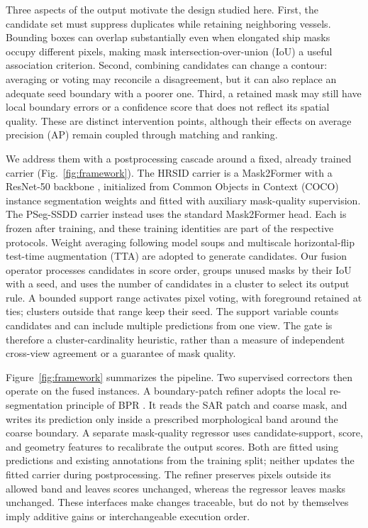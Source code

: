 Three aspects of the output motivate the design studied here. First, the candidate set must suppress duplicates while retaining neighboring vessels. Bounding boxes can overlap substantially even when elongated ship masks occupy different pixels, making mask intersection-over-union (IoU) a useful association criterion. Second, combining candidates can change a contour: averaging or voting may reconcile a disagreement, but it can also replace an adequate seed boundary with a poorer one. Third, a retained mask may still have local boundary errors or a confidence score that does not reflect its spatial quality. These are distinct intervention points, although their effects on average precision (AP) remain coupled through matching and ranking.

We address them with a postprocessing cascade around a fixed, already trained carrier (Fig.~\ref{fig:framework}). The HRSID carrier is a Mask2Former with a ResNet-50 backbone \cite{mask2former2022}, initialized from Common Objects in Context (COCO) instance segmentation weights and fitted with auxiliary mask-quality supervision. The PSeg-SSDD carrier instead uses the standard Mask2Former head. Each is frozen after training, and these training identities are part of the respective protocols. Weight averaging following model soups \cite{modelsoups2022} and multiscale horizontal-flip test-time augmentation (TTA) are adopted to generate candidates. Our fusion operator processes candidates in score order, groups unused masks by their IoU with a seed, and uses the number of candidates in a cluster to select its output rule. A bounded support range activates pixel voting, with foreground retained at ties; clusters outside that range keep their seed. The support variable counts candidates and can include multiple predictions from one view. The gate is therefore a cluster-cardinality heuristic, rather than a measure of independent cross-view agreement or a guarantee of mask quality.

Figure~\ref{fig:framework} summarizes the pipeline. Two supervised correctors then operate on the fused instances. A boundary-patch refiner adopts the local re-segmentation principle of BPR \cite{bpr2021}. It reads the SAR patch and coarse mask, and writes its prediction only inside a prescribed morphological band around the coarse boundary. A separate mask-quality regressor uses candidate-support, score, and geometry features to recalibrate the output scores. Both are fitted using predictions and existing annotations from the training split; neither updates the fitted carrier during postprocessing. The refiner preserves pixels outside its allowed band and leaves scores unchanged, whereas the regressor leaves masks unchanged. These interfaces make changes traceable, but do not by themselves imply additive gains or interchangeable execution order.

